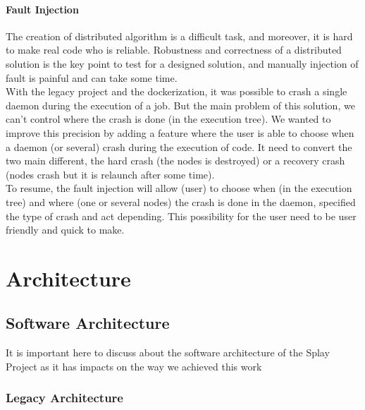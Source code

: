 \documentclass{eplmastersthesis}
\begin{document}
        \subsubsection{Fault Injection} %

        The creation of distributed algorithm is a difficult task, and
        moreover, it is hard to make real code who is reliable. Robustness
        and correctness of a distributed solution is the key point to test
        for a designed solution, and manually injection of fault is painful
        and can take some time. \\

        With the legacy project and the dockerization, it was possible to
        crash a single daemon during the execution of a job. But the main
        problem of this solution, we can't control where the crash is done
        (in the execution tree). We wanted to improve this precision by adding
        a feature where the user is able to choose when a daemon (or several)
        crash during the execution of code. It need to convert the two main
        different, the hard crash (the nodes is destroyed) or a recovery crash
        (nodes crash but it is relaunch after some time). \\

        To resume, the fault injection will allow (user) to choose when (in
        the execution tree) and where (one or several nodes) the crash is done
        in the daemon, specified the type of crash and act depending. This
        possibility for the user need to be user friendly and quick to make.


  \chapter{Architecture}

    \section{Software Architecture}

      It is important here to discuss about the software architecture of the
      Splay Project as it has impacts on the way we achieved this work

      \subsection{Legacy Architecture}
\end{document}
